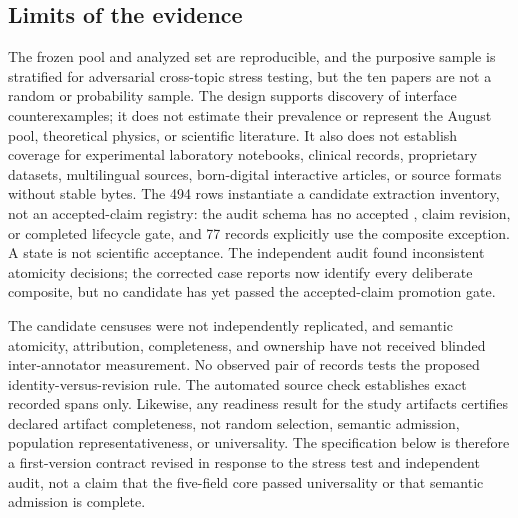 \subsection{Limits of the evidence}

The frozen pool and analyzed set are reproducible, and the purposive sample is stratified for adversarial cross-topic stress testing, but the ten papers are not a random or probability sample. The design supports discovery of interface counterexamples; it does not estimate their prevalence or represent the August pool, theoretical physics, or scientific literature. It also does not establish coverage for experimental laboratory notebooks, clinical records, proprietary datasets, multilingual sources, born-digital interactive articles, or source formats without stable bytes. The 494 rows instantiate a candidate extraction inventory, not an accepted-claim registry: the audit schema has no accepted , claim revision, or completed lifecycle gate, and 77 records explicitly use the composite exception. A  state is not scientific acceptance. The independent audit found inconsistent atomicity decisions; the corrected case reports now identify every deliberate composite, but no candidate has yet passed the accepted-claim promotion gate.

The candidate censuses were not independently replicated, and semantic atomicity, attribution, completeness, and ownership have not received blinded inter-annotator measurement. No observed pair of records tests the proposed identity-versus-revision rule. The automated source check establishes exact recorded spans only. Likewise, any readiness result for the study artifacts certifies declared artifact completeness, not random selection, semantic admission, population representativeness, or universality. The specification below is therefore a first-version contract revised in response to the stress test and independent audit, not a claim that the five-field core passed universality or that semantic admission is complete.